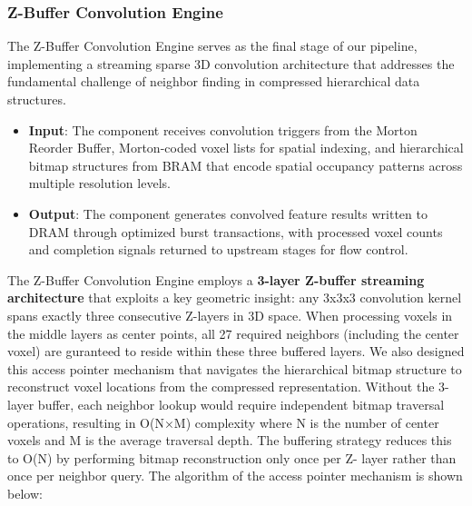 \documentclass[sigconf, screen]{acmart}
\begin{document}
\subsubsection{Z-Buffer Convolution Engine}
The Z-Buffer Convolution Engine serves as the final stage of our pipeline, implementing a streaming sparse 3D convolution architecture that addresses the fundamental challenge of neighbor finding in compressed hierarchical data structures.
\begin{itemize}
    \item \textbf{Input}: The component receives convolution triggers from the Morton Reorder Buffer, Morton-coded voxel lists for spatial indexing, and hierarchical bitmap structures from BRAM that encode spatial occupancy patterns across multiple resolution levels.
    \item \textbf{Output}: The component generates convolved feature results written to DRAM through optimized burst transactions, with processed voxel counts and completion signals returned to upstream stages for flow control.
\end{itemize}
The Z-Buffer Convolution Engine employs a \textbf{3-layer Z-buffer streaming architecture} that exploits a key geometric insight: any 3x3x3 convolution kernel spans exactly three consecutive Z-layers in 3D space. When processing voxels in the middle layers as center points, all 27 required neighbors (including the center voxel) are guranteed to reside within these three buffered layers.
We also designed this access pointer mechanism that navigates the hierarchical bitmap structure to reconstruct voxel locations from the compressed representation. Without the 3-layer buffer, each neighbor lookup would require independent bitmap traversal operations, resulting in O(N×M) complexity where N is the number of center voxels and M is the average traversal depth. The buffering strategy reduces this to O(N) by performing bitmap reconstruction only once per Z-
layer rather than once per neighbor query.
The algorithm of the access pointer mechanism is shown below:
\end{document}

